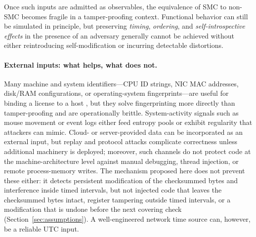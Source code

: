 \documentclass[11pt]{article}
\begin{document}
Once such inputs are admitted as observables, the equivalence of SMC to
non-SMC becomes fragile in a tamper-proofing context.  Functional behavior can
still be simulated in principle, but preserving \emph{timing}, \emph{ordering},
and \emph{self-introspective effects} in the presence of an adversary generally
cannot be achieved without either reintroducing self-modification or incurring
detectable distortions.

\paragraph{External inputs: what helps, what does not.}
Many machine and system identifiers---CPU ID strings, NIC MAC addresses,
disk/RAM configurations, or operating-system fingerprints---are useful for
binding a license to a host \cite{tan2013}, but they solve fingerprinting more
directly than tamper-proofing and are operationally brittle.  System-activity
signals such as mouse movement or event logs either feed entropy pools
\cite{HU20092286} or exhibit regularity that attackers can mimic.  Cloud- or
server-provided data can be incorporated as an external input, but replay and
protocol attacks complicate correctness unless additional machinery is deployed;
moreover, such channels do not protect code at the machine-architecture level
against manual debugging, thread injection, or remote process-memory writes.  The mechanism proposed here does not prevent these either: it detects persistent modification of the checksummed bytes and interference inside timed intervals, but not injected code that leaves the checksummed bytes intact, register tampering outside timed intervals, or a modification that is undone before the next covering check (Section~\ref{sec:assumptions}).  A
well-engineered network time source can, however, be a reliable UTC input.
\end{document}
